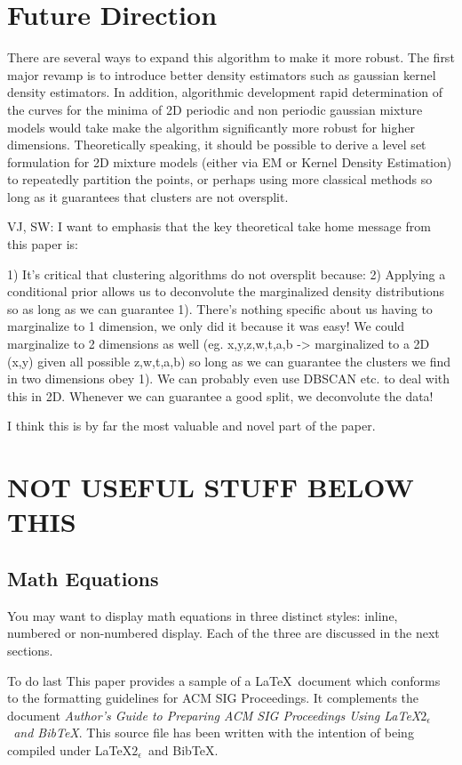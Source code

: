 \documentclass{acm_proc_article-sp}
\begin{document}
\section{Future Direction}

There are several ways to expand this algorithm to make it more robust. The first major revamp is to introduce better density estimators such as gaussian kernel density estimators. In addition, algorithmic development rapid determination of the curves for the minima of 2D periodic and non periodic gaussian mixture models would take make the algorithm significantly more robust for higher dimensions. Theoretically speaking, it should be possible to derive a level set formulation for 2D mixture models (either via EM or Kernel Density Estimation) to repeatedly partition the points, or perhaps using more classical methods so long as it guarantees that clusters are not oversplit. 

VJ, SW: I want to emphasis that the key theoretical take home message from this paper is:

1) It's critical that clustering algorithms do not oversplit because:
2) Applying a conditional prior allows us to deconvolute the marginalized density distributions so as long as we can guarantee 1). There's nothing specific about us having to marginalize to 1 dimension, we only did it because it was easy! We could marginalize to 2 dimensions as well (eg. x,y,z,w,t,a,b -> marginalized to a 2D (x,y) given all possible z,w,t,a,b) so long as we can guarantee the clusters we find in two dimensions obey 1). We can probably even use DBSCAN etc. to deal with this in 2D. Whenever we can guarantee a good split, we deconvolute the data!

I think this is by far the most valuable and novel part of the paper. 

\section{NOT USEFUL STUFF BELOW THIS}

\subsection{Math Equations}
You may want to display math equations in three distinct styles:
inline, numbered or non-numbered display.  Each of
the three are discussed in the next sections.

To do last
This paper provides a sample of a \LaTeX\ document which conforms to
the formatting guidelines for ACM SIG Proceedings.
It complements the document \textit{Author's Guide to Preparing
ACM SIG Proceedings Using \LaTeX$2_\epsilon$\ and Bib\TeX}. This
source file has been written with the intention of being
compiled under \LaTeX$2_\epsilon$\ and BibTeX.
\end{document}
